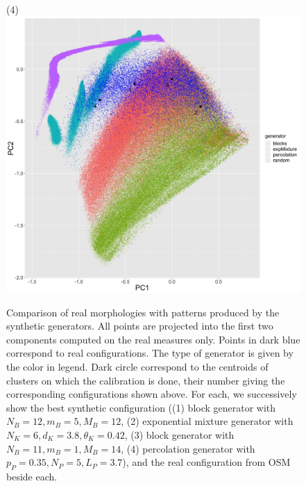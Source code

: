 \documentclass[letterpaper]{article}
\begin{document}
\begin{figure}
    (4)
    \\
    \includegraphics[width=\linewidth]{lhscalib_projrealpcs.jpg}
    \caption{Comparison of real morphologies with patterns produced by the synthetic generators. All points are projected into the first two components computed on the real measures only. Points in dark blue correspond to real configurations. The type of generator is given by the color in legend. Dark circle correspond to the centroids of clusters on which the calibration is done, their number giving the corresponding configurations shown above. For each, we successively show the best synthetic configuration ((1) block generator with $N_B=12,m_B=5,M_B=12$, (2) exponential mixture generator with $N_K=6,d_K=3.8,\theta_K=0.42$, (3) block generator with $N_B=11,m_B=1,M_B=14$, (4) percolation generator with $p_P=0.35,N_P=5,L_P=3.7$), and the real configuration from OSM beside each.}
    \label{fig:lhs}
\end{figure}
\end{document}
